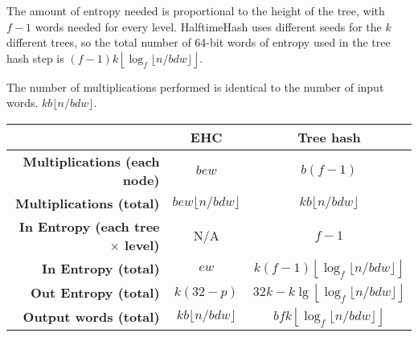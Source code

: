 \documentclass[runningheads]{llncs}
\begin{document}
The amount of entropy needed is proportional to the height of the tree, with $f - 1$ words needed for every level.
HalftimeHash uses different seeds for the $k$ different trees, so the total number of 64-bit words of entropy used in the tree hash step is $(f - 1) k\left\lfloor\log_f \lfloor n/b d w\rfloor\right\rfloor$.

The number of multiplications performed is identical to the number of input words. $k b \lfloor n / b d w \rfloor$.


\begin{tabular}{|r|c|c|}
  \hline & {\bf EHC} & {\bf Tree hash}\\
  \hline {\bf Multiplications (each node)} & $b e w$ & $b (f-1)$ \\
  \hline {\bf Multiplications (total)} & $b e w \lfloor n / b d w\rfloor$ & $k b \lfloor n / b d w \rfloor$ \\
  \hline {\bf In Entropy (each tree $\times$ level)} & N/A & $f-1$ \\
  \hline {\bf In Entropy (total)} & $e w$ & $k (f-1) \left\lfloor \log_f \lfloor n / b d w \rfloor \right\rfloor$ \\
  \hline {\bf Out Entropy (total)} & $k (32-p)$ & $32k - k\lg\left\lfloor\log_f \lfloor n/b d w\rfloor\right\rfloor$\\
  \hline {\bf Output words (total)} & $k b \lfloor n / b d w\rfloor $ & $b f k \left\lfloor \log_f \lfloor n / b d w \rfloor \right\rfloor$\\
  \hline
\end{tabular}
\end{document}
